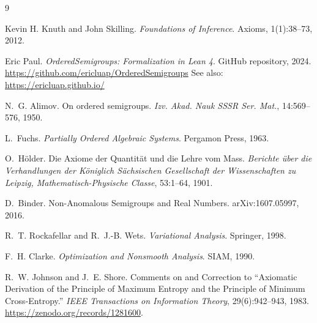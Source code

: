 \documentclass[11pt]{article}
\theoremstyle{definition}
\theoremstyle{remark}
\begin{document}

\begin{thebibliography}{9}

Kevin H. Knuth and John Skilling.
\textit{Foundations of Inference}.
Axioms, 1(1):38--73, 2012.

Eric Paul.
\textit{OrderedSemigroups: Formalization in Lean 4}.
GitHub repository, 2024.
\url{https://github.com/ericluap/OrderedSemigroups}
See also: \url{https://ericluap.github.io/}

N.~G. Alimov.
On ordered semigroups.
\textit{Izv. Akad. Nauk SSSR Ser. Mat.}, 14:569--576, 1950.

L.~Fuchs.
\textit{Partially Ordered Algebraic Systems}.
Pergamon Press, 1963.

O.~H\"older.
Die Axiome der Quantit\"at und die Lehre vom Mass.
\textit{Berichte \"uber die Verhandlungen der K\"oniglich S\"achsischen Gesellschaft der Wissenschaften zu Leipzig, Mathematisch-Physische Classe}, 53:1--64, 1901.

D.~Binder.
Non-Anomalous Semigroups and Real Numbers.
arXiv:1607.05997, 2016.

R.~T. Rockafellar and R.~J.-B. Wets.
\textit{Variational Analysis}.
Springer, 1998.

F.~H. Clarke.
\textit{Optimization and Nonsmooth Analysis}.
SIAM, 1990.

R.~W. Johnson and J.~E. Shore.
Comments on and Correction to ``Axiomatic Derivation of the Principle of Maximum Entropy and the Principle of Minimum Cross-Entropy.''
\emph{IEEE Transactions on Information Theory}, 29(6):942--943, 1983.
\url{https://zenodo.org/records/1281600}.

\end{thebibliography}
\end{document}
